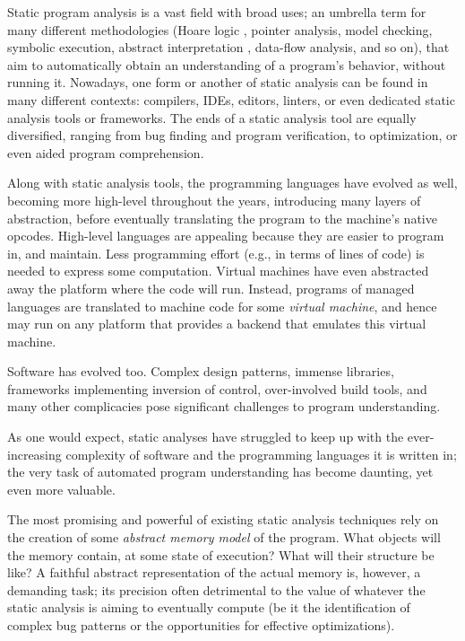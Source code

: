 Static program analysis is a vast field with broad uses; an umbrella
term for many different methodologies (Hoare logic
\cite{journals/cacm/Hoare69,floyd1967assigning,lics:2002/Reynolds,csl/OHearnRY01},
pointer analysis, model checking, symbolic execution, abstract
interpretation
\cite{popl/CousotC77,journals/jlp/CousotC92,journals/logcom/CousotC92},
data-flow analysis, and so on), that aim to automatically obtain an
understanding of a program's behavior, without running it. Nowadays,
one form or another of static analysis can be found in many different
contexts: compilers, IDEs, editors, linters, or even dedicated static
analysis tools or frameworks. The ends of a static analysis tool are
equally diversified, ranging from bug finding and program
verification, to optimization, or even aided program comprehension.

Along with static analysis tools, the programming languages have
evolved as well, becoming more high-level throughout the years,
introducing many layers of abstraction, before eventually translating
the program to the machine's native opcodes. High-level languages are
appealing because they are easier to program in, and maintain. Less
programming effort (e.g., in terms of lines of code) is needed to
express some computation. Virtual machines have even abstracted away
the platform where the code will run. Instead, programs of managed
languages are translated to machine code for some \emph{virtual
  machine}, and hence may run on any platform that provides a backend
that emulates this virtual machine.

Software has evolved too. Complex design patterns, immense libraries,
frameworks implementing inversion of control, over-involved build
tools, and many other complicacies pose significant challenges to
program understanding.

As one would expect, static analyses have struggled to keep up with
the ever-increasing complexity of software and the programming
languages it is written in; the very task of automated program
understanding has become daunting, yet even more valuable.

The most promising and powerful of existing static analysis techniques
rely on the creation of some \emph{abstract memory model} of the
program. What objects will the memory contain, at some state of
execution? What will their structure be like?  A faithful abstract
representation of the actual memory is, however, a demanding task; its
precision often detrimental to the value of whatever the static
analysis is aiming to eventually compute (be it the identification of
complex bug patterns or the opportunities for effective
optimizations).

